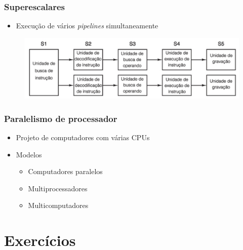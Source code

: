 \documentclass[aspectratio=169,
				xcolor=table]{beamer}
\begin{document}
	\begin{frame}
		\frametitle{Superescalares}
		\begin{itemize}
			\item Execução de vários \textit{pipelines} simultaneamente

		\end{itemize}
		\begin{figure}
			\includegraphics[width=\textwidth , keepaspectratio]{../figs/cap05/pipeline02.png} 
		\end{figure}
	\end{frame}	

	\begin{frame}
		\frametitle{Paralelismo de processador}
		\begin{itemize}
			\item Projeto de computadores com várias CPUs
			\vspace{1em}
			\item Modelos
			\begin{itemize}
				\item Computadores paralelos
				\item Multiprocessadores
				\item Multicomputadores

			\end{itemize}

		\end{itemize}
	\end{frame}


	\section{Exercícios}	
	
\end{document}
